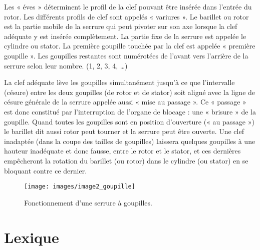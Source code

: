 \documentclass[a4paper,french,11pt,twoside]{report}
\begin{document}
Les « éves » déterminent le profil de la clef pouvant être insérée dans l'entrée du rotor. Les différents profils de clef sont appelés « variures ». Le barillet ou rotor est la partie mobile de la serrure qui peut pivoter sur son axe lorsque la clef adéquate y est insérée complètement. La partie fixe de la serrure est appelée le cylindre ou stator. La première goupille touchée par la clef est appelée « première goupille ». Les goupilles restantes sont numérotées de l'avant vers l'arrière de la serrure selon leur nombre. (1, 2, 3, 4, \ldots)

La clef adéquate lève les goupilles simultanément jusqu'à ce que l'intervalle (césure) entre les deux goupilles (de rotor et de stator) soit aligné avec la ligne de césure générale de la serrure appelée aussi « mise au  passage ». Ce « passage » est donc constitué par l'interruption de l'organe de blocage : une « brisure » de la goupille.  Quand toutes les goupilles sont en position d'ouverture (« au passage ») le barillet dit aussi rotor peut tourner et la serrure peut être ouverte. Une clef inadaptée (dans la coupe des tailles de goupilles) laissera quelques goupilles à une hauteur inadéquate et donc fausse, entre le rotor et le stator, et ces dernières empêcheront la rotation du barillet (ou rotor) dans le cylindre (ou stator) en se bloquant contre ce dernier.


\begin{figure}[ht]
  \texttt{[image: images/image2\_goupille]}
  \caption{Fonctionnement d'une serrure à goupilles.\label{fonctionnement_serrure_goupilles}}
\end{figure}


\section*{Lexique}
\end{document}

